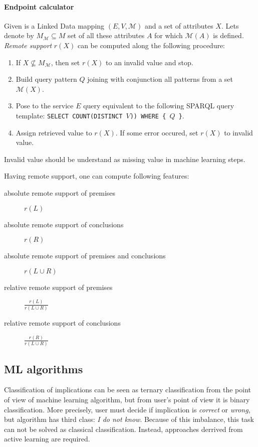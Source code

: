 \documentclass{llncs}
\newcommand{\mapping}{\mathcal{M}}
\begin{document}
\paragraph{Endpoint calculator}
Given is a Linked Data mapping $(E,V,\mapping)$ and a set of attributes $X$. Lets denote by $M_\mapping\subseteq M$ set of all these attributes $A$ for which $\mapping(A)$ is defined.
\emph{Remote support} $r(X)$ can be computed along the following procedure:
\begin{enumerate}
\item If $X\not\subseteq M_\mapping$, then set $r(X)$ to an invalid value and stop.
\item Build query pattern $Q$ joining with conjunction all patterns from a set $\mapping(X)$.
\item Pose to the service $E$ query equivalent to the following SPARQL query template:
\texttt{SELECT COUNT(DISTINCT $V$)) WHERE \{ $Q$ \}}.
\item Assign retrieved value to $r(X)$. If some error occured, set $r(X)$ to invalid value.
\end{enumerate}
Invalid value should be understand as missing value in machine learning steps.

Having remote support, one can compute following features:
\begin{description}
\item[absolute remote support of premises] $r(L)$
\item[absolute remote support of conclusions] $r(R)$
\item[absolute remote support of premises and conclusions] $r(L\cup R)$
\item[relative remote support of premises] $\frac{r(L)}{r(L\cup R)}$
\item[relative remote support of conclusions] $\frac{r(R)}{r(L\cup R)}$
\end{description}

\subsection{ML algorithms}

Classification of implications can be seen as ternary classification from the
point of view of machine learning algorithm, but from user's point of view it
is binary classification. More precisely, user must decide if implication is
\emph{correct} or \emph{wrong}, but algorithm has third class: \emph{I do not
know}. Because of this imbalance, this task can not be solved as classical
classification. Instead, approaches derrived from active learning are required.
\end{document}
